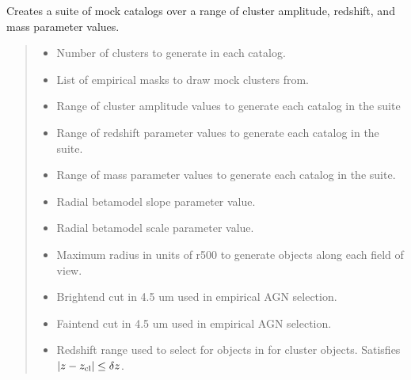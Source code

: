 \documentclass[letterpaper,12pt,english]{sphinxmanual}
\begin{document}
\begin{fulllineitems}
\begin{fulllineitems}
\pysigstopsignatures
\sphinxAtStartPar
Creates a suite of mock catalogs over a range of cluster amplitude, redshift, and mass parameter values.
\begin{quote}\begin{description}
\begin{itemize}
\item {} 
\sphinxAtStartPar
{} \textendash{} Number of clusters to generate in each catalog.

\item {} 
\sphinxAtStartPar
{} \textendash{} List of empirical masks to draw mock clusters from.

\item {} 
\sphinxAtStartPar
{} \textendash{} Range of cluster amplitude values to generate each catalog in the suite

\item {} 
\sphinxAtStartPar
{} \textendash{} Range of redshift parameter values to generate each catalog in the suite.

\item {} 
\sphinxAtStartPar
{} \textendash{} Range of mass parameter values to generate each catalog in the suite.

\item {} 
\sphinxAtStartPar
{} \textendash{} Radial beta\sphinxhyphen{}model slope parameter value.

\item {} 
\sphinxAtStartPar
{} \textendash{} Radial beta\sphinxhyphen{}model scale parameter value.

\item {} 
\sphinxAtStartPar
{} \textendash{} Maximum radius in units of r500 to generate objects along each field of view.

\item {} 
\sphinxAtStartPar
{} \textendash{} Bright\sphinxhyphen{}end cut in 4.5 um used in empirical AGN selection.

\item {} 
\sphinxAtStartPar
{} \textendash{} Faint\sphinxhyphen{}end cut in 4.5 um used in empirical AGN selection.

\item {} 
\sphinxAtStartPar
{} \textendash{} Redshift range used to select for objects in  for cluster objects. Satisfies
\(|z - z_{\rm cl} | \leq \delta z\).


\end{itemize}
\end{description}
\end{quote}
\end{fulllineitems}
\end{fulllineitems}
\end{document}

